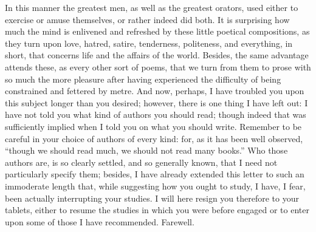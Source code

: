 In this manner the greatest men, as well as the greatest orators, used
either to exercise or amuse themselves, or rather indeed did both. It is
surprising how much the mind is enlivened and refreshed by these little
poetical compositions, as they turn upon love, hatred, satire, tenderness,
politeness, and everything, in short, that concerns life and the affairs
of the world. Besides, the same advantage attends these, as every other
sort of poems, that we turn from them to prose with so much the more
pleasure after having experienced the difficulty of being constrained and
fettered by metre. And now, perhaps, I have troubled you upon this subject
longer than you desired; however, there is one thing I have left out: I
have not told you what kind of authors you should read; though indeed that
was sufficiently implied when I told you on what you should write.
Remember to be careful in your choice of authors of every kind: for, as it
has been well observed, ``though we should read much, we should not read
many books.'' Who those authors are, is so clearly settled, and so
generally known, that I need not particularly specify them; besides, I
have already extended this letter to such an immoderate length that, while
suggesting how you ought to study, I have, I fear, been actually
interrupting your studies. I will here resign you therefore to your
tablets, either to resume the studies in which you were before engaged or
to enter upon some of those I have recommended. Farewell.


